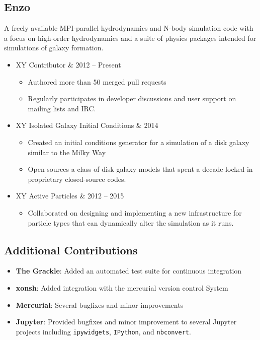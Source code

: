 \documentclass[10pt,letterpaper]{article}
\newcommand{\textline}[2]{
  \begin{tabularx}{\textwidth}{XY}
  #1 & #2
  \end{tabularx}
}
\begin{document}
\subsection*{Enzo}

A freely available MPI-parallel hydrodynamics and N-body simulation code with a
focus on high-order hydrodynamics and a suite of physics packages intended for
simulations of galaxy formation.

\begin{itemize}
\item[] \textline{Contributor}{2012 -- Present}
  \begin{itemize}
  \item Authored more than 50 merged pull requests
  \item Regularly participates in developer discussions and user support on mailing lists and IRC.
  \end{itemize}
\item[] \textline{Isolated Galaxy Initial Conditions}{2014}
  \begin{itemize}
  \item Created an initial conditions generator for a simulation of a disk
    galaxy similar to the Milky Way
  \item Open sources a class of disk galaxy models that spent a decade locked in
    proprietary closed-source codes.
  \end{itemize}
\item[] \textline{Active Particles}{2012 -- 2015}
  \begin{itemize}
  \item Collaborated on designing and implementing a new infrastructure for
    particle types that can dynamically alter the simulation as it runs.
  \end{itemize}
\end{itemize}

\subsection*{Additional Contributions}

\begin{itemize}
\item[] {\bf The Grackle}: Added an automated test suite for continuous
  integration
\item[] {\bf xonsh}: Added integration with the mercurial version control System
\item[] {\bf Mercurial}: Several bugfixes and minor improvements
\item[] {\bf Jupyter}: Provided bugfixes and minor improvement to several
  Jupyter projects including \texttt{ipywidgets}, \texttt{IPython}, and
  \texttt{nbconvert}.
\end{itemize}
\end{document}
